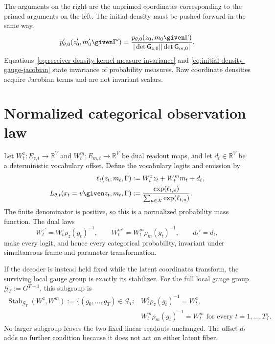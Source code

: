 The arguments on the right are the unprimed coordinates corresponding to the primed arguments on the left.  The initial density must be pushed forward in the same way,
\begin{equation}
p_{\theta,0}'(z_0',m_0'\given\Gamma')
=\frac{p_{\theta,0}(z_0,m_0\given\Gamma)}
{|\det\mathsf G_{z,0}||\det\mathsf G_{m,0}|}.
\label{eq:initial-density-gauge-jacobian}
\end{equation}
Equations~\eqref{eq:receiver-density-kernel-measure-invariance} and \eqref{eq:initial-density-gauge-jacobian} state invariance of probability measures.  Raw coordinate densities acquire Jacobian terms and are not invariant scalars.

\section{Normalized categorical observation law}

Let $W_t^z:E_{z,t}\to\mathbb R^V$ and $W_t^m:E_{m,t}\to\mathbb R^V$ be dual readout maps, and let $d_t\in\mathbb R^V$ be a deterministic vocabulary offset.  Define the vocabulary logits and emission by
\begin{equation}
\begin{aligned}
\ell_t(z_t,m_t,\Gamma)
&:=W_t^zz_t+W_t^mm_t+d_t,\\
L_{\theta,t}(x_t=v\given z_t,m_t,\Gamma)
&:=\frac{\exp(\ell_{t,v})}
{\sum_{u\in\mathcal X}\exp(\ell_{t,u})}.
\end{aligned}
\label{eq:gauge-compatible-categorical-emission}
\end{equation}
The finite denominator is positive, so this is a normalized probability mass function.  The dual laws
\begin{equation}
W_t^{z\prime}=W_t^z\rho_z(g_t)^{-1},
\qquad
W_t^{m\prime}=W_t^m\rho_m(g_t)^{-1},
\qquad
d_t'=d_t,
\label{eq:dual-decoder-gauge-laws}
\end{equation}
make every logit, and hence every categorical probability, invariant under simultaneous frame and parameter transformation.

If the decoder is instead held fixed while the latent coordinates transform, the surviving local gauge group is exactly its stabilizer.  For the full local gauge group $\mathcal G_T:=G^{T+1}$, this subgroup is
\begin{equation}
\begin{aligned}
\operatorname{Stab}_{\mathcal G_T}(W^z,W^m)
:=\bigl\{(g_0,\ldots,g_T)\in\mathcal G_T:
&W_t^z\rho_z(g_t)^{-1}=W_t^z,\\
&W_t^m\rho_m(g_t)^{-1}=W_t^m
\text{ for every }t=1,\ldots,T\bigr\}.
\end{aligned}
\label{eq:fixed-decoder-stabilizer}
\end{equation}
No larger subgroup leaves the two fixed linear readouts unchanged.  The offset $d_t$ adds no further condition because it does not act on either latent fiber.

